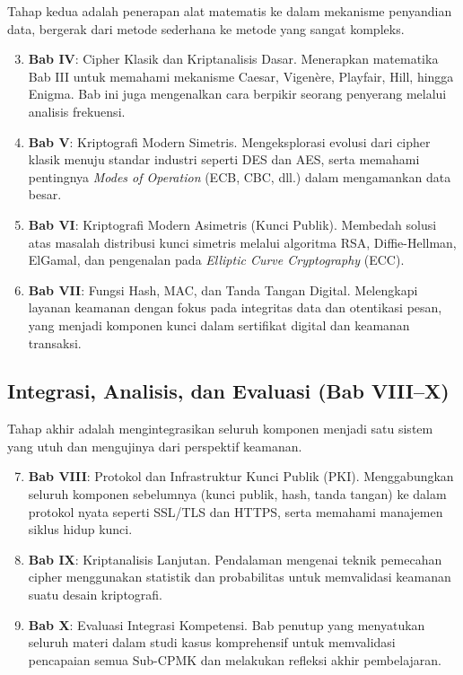 Tahap kedua adalah penerapan alat matematis ke dalam mekanisme penyandian data, bergerak dari metode sederhana ke metode yang sangat kompleks.
\begin{enumerate}
  \setcounter{enumi}{2}
  \item \textbf{Bab IV}: Cipher Klasik dan Kriptanalisis Dasar. Menerapkan matematika Bab III untuk memahami mekanisme Caesar, Vigenère, Playfair, Hill, hingga Enigma. Bab ini juga mengenalkan cara berpikir seorang penyerang melalui analisis frekuensi.
  \item \textbf{Bab V}: Kriptografi Modern Simetris. Mengeksplorasi evolusi dari cipher klasik menuju standar industri seperti DES dan AES, serta memahami pentingnya \textit{Modes of Operation} (ECB, CBC, dll.) dalam mengamankan data besar.
  \item \textbf{Bab VI}: Kriptografi Modern Asimetris (Kunci Publik). Membedah solusi atas masalah distribusi kunci simetris melalui algoritma RSA, Diffie-Hellman, ElGamal, dan pengenalan pada \textit{Elliptic Curve Cryptography} (ECC).
  \item \textbf{Bab VII}: Fungsi Hash, MAC, dan Tanda Tangan Digital. Melengkapi layanan keamanan dengan fokus pada integritas data dan otentikasi pesan, yang menjadi komponen kunci dalam sertifikat digital dan keamanan transaksi.
\end{enumerate}

\subsection{Integrasi, Analisis, dan Evaluasi (Bab VIII--X)}

Tahap akhir adalah mengintegrasikan seluruh komponen menjadi satu sistem yang utuh dan mengujinya dari perspektif keamanan.
\begin{enumerate}
  \setcounter{enumi}{6}
  \item \textbf{Bab VIII}: Protokol dan Infrastruktur Kunci Publik (PKI). Menggabungkan seluruh komponen sebelumnya (kunci publik, hash, tanda tangan) ke dalam protokol nyata seperti SSL/TLS dan HTTPS, serta memahami manajemen siklus hidup kunci.
  \item \textbf{Bab IX}: Kriptanalisis Lanjutan. Pendalaman mengenai teknik pemecahan cipher menggunakan statistik dan probabilitas untuk memvalidasi keamanan suatu desain kriptografi.
  \item \textbf{Bab X}: Evaluasi Integrasi Kompetensi. Bab penutup yang menyatukan seluruh materi dalam studi kasus komprehensif untuk memvalidasi pencapaian semua Sub-CPMK dan melakukan refleksi akhir pembelajaran.
\end{enumerate}

